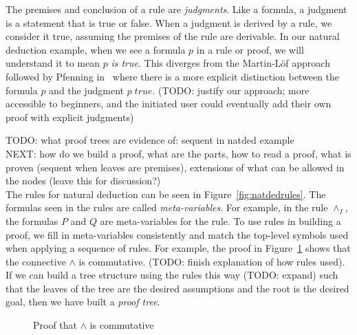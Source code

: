 \documentclass[conference]{IEEEtran}
\begin{document}
The premises and conclusion of a rule are \textit{judgments}. Like a formula, a judgment is a statement that is true or false. When a judgment is derived by a rule, we consider it true, assuming the premises of the rule are derivable. In our natural deduction example, when we see a formula $p$ in a rule or proof, we will understand it to mean $p$ \textit{is true}. This diverges from the Martin-L{\"o}f approach followed by Pfenning in~\cite{natded-pfenning} where there is a more explicit distinction between the formula $p$ and the judgment $p \; \mathit{true}$. (TODO: justify our approach; more accessible to beginners, and the initiated user could eventually add their own proof with explicit judgments)

TODO: what proof trees are evidence of: sequent in natded example \\

NEXT: how do we build a proof, what are the parts, how to read a proof, what is proven (sequent when leaves are premises), extensions of what can be allowed in the nodes (leave this for discussion?) \\

The rules for natural deduction can be seen in Figure~\ref{fig:natdedrules}. The formulas seen in the rules are called \textit{meta-variables}. For example, in the rule $\wedge_I$, the formulas $P$ and $Q$ are meta-variables for the rule. To use rules in building a proof, we fill in meta-variables consistently and match the top-level symbols used when applying a sequence of rules. For example, the proof in Figure~\ref{fig:andcomm} shows that the connective $\wedge$ is commutative. (TODO: finish explanation of how rules used). If we can build a tree structure using the rules this way (TODO: expand) such that the leaves of the tree are the desired assumptions and the root is the desired goal, then we have built a \textit{proof tree}.

\begin{figure}

\begin{prooftree}


\end{prooftree}

\caption{Proof that $\wedge$ is commutative}
\label{fig:andcomm}
\end{figure}
\end{document}
